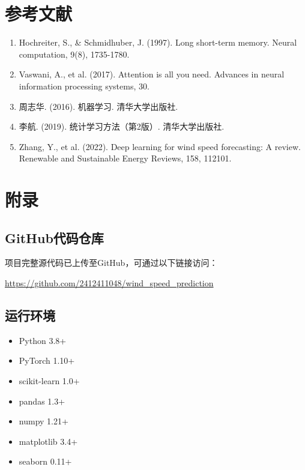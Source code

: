 \documentclass[12pt,a4paper]{article}
\begin{document}
\newpage

\section*{参考文献}

\begin{enumerate}
    \item Hochreiter, S., \& Schmidhuber, J. (1997). Long short-term memory. Neural computation, 9(8), 1735-1780.
    
    \item Vaswani, A., et al. (2017). Attention is all you need. Advances in neural information processing systems, 30.
    
    \item 周志华. (2016). 机器学习. 清华大学出版社.
    
    \item 李航. (2019). 统计学习方法（第2版）. 清华大学出版社.
    
    \item Zhang, Y., et al. (2022). Deep learning for wind speed forecasting: A review. Renewable and Sustainable Energy Reviews, 158, 112101.
\end{enumerate}

\newpage

\section*{附录}

\subsection*{GitHub代码仓库}
项目完整源代码已上传至GitHub，可通过以下链接访问：
\begin{center}
\href{https://github.com/2412411048/wind_speed_prediction}{https://github.com/2412411048/wind\_speed\_prediction}
\end{center}

\subsection*{运行环境}
\begin{itemize}
    \item Python 3.8+
    \item PyTorch 1.10+
    \item scikit-learn 1.0+
    \item pandas 1.3+
    \item numpy 1.21+
    \item matplotlib 3.4+
    \item seaborn 0.11+
\end{itemize}
\end{document}
